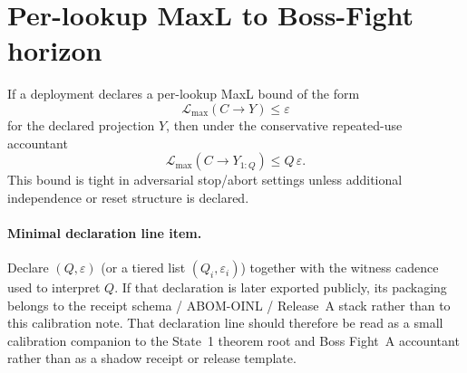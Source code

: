 \documentclass[11pt]{article}
\theoremstyle{definition}
\theoremstyle{remark}
\begin{document}
\section{Per-lookup MaxL to Boss-Fight horizon}

If a deployment declares a per-lookup MaxL bound of the form
\[
\mathcal{L}_{\max}(C\!\to\! Y)\le \varepsilon
\]
for the declared projection $Y$, then under the conservative repeated-use accountant
\[
\mathcal{L}_{\max}(C\!\to\! Y_{1:Q}) \le Q\,\varepsilon.
\]
This bound is tight in adversarial stop/abort settings unless additional independence or reset structure is declared.\cite{series:bossfightA}

\paragraph{Minimal declaration line item.}
Declare $(Q,\varepsilon)$ (or a tiered list $(Q_i,\varepsilon_i)$) together with the witness cadence used to interpret $Q$.
If that declaration is later exported publicly, its packaging belongs to the receipt schema / ABOM-OINL / Release~A stack rather than to this calibration note.\cite{series:receiptitems,series:abomoinl,series:releaseproperty}
That declaration line should therefore be read as a small calibration companion to the State~1 theorem root and Boss Fight~A accountant rather than as a shadow receipt or release template.
\end{document}
